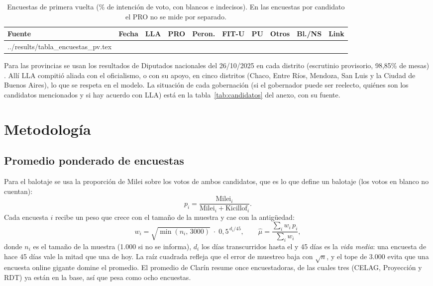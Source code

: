 \documentclass{article}
\makeatletter
\newcommand{\tablainput}[1]{\@@input #1 }
\makeatother
\begin{document}
\begin{table}[htbp]
\centering
\caption{Encuestas de primera vuelta (\% de intención de voto, con blancos e
indecisos). En las encuestas por candidato el PRO no se mide por separado.}
\label{tab:pv}
\footnotesize
\begin{tabular}{lcrrrrrrrc}
\toprule
Fuente & Fecha & LLA & PRO & Peron. & FIT-U & PU & Otros & Bl./NS & Link \\
\midrule
\tablainput{../results/tabla_encuestas_pv.tex}
\bottomrule
\end{tabular}
\end{table}

Para las provincias se usan los resultados de Diputados nacionales del
26/10/2025 en cada distrito (escrutinio provisorio, 98,85\% de mesas)
\cite{c5n2025}. Allí LLA compitió aliada con el oficialismo, o con su apoyo, en cinco distritos
(Chaco, Entre Ríos, Mendoza, San Luis y la Ciudad de Buenos Aires), lo que se
respeta en el modelo. La situación de cada gobernación (si el gobernador puede
ser reelecto, quiénes son los candidatos mencionados y si hay acuerdo con LLA)
está en la tabla~\ref{tab:candidatos} del anexo, con su fuente.

\FloatBarrier
\section{Metodología}

\subsection{Promedio ponderado de encuestas}
\label{sec:promedio}

Para el balotaje se usa la proporción de Milei sobre los votos de ambos
candidatos, que es lo que define un balotaje (los votos en blanco no cuentan):
\begin{equation}
  p_i = \frac{\text{Milei}_i}{\text{Milei}_i + \text{Kicillof}_i}.
\end{equation}
Cada encuesta $i$ recibe un peso que crece con el tamaño de la muestra y cae con
la antigüedad:
\begin{equation}
  w_i = \sqrt{\min(n_i,\,3000)}\;\cdot\;0{,}5^{\,d_i/45},
  \qquad \hat{\mu} = \frac{\sum_i w_i\,p_i}{\sum_i w_i},
\end{equation}
donde $n_i$ es el tamaño de la muestra (1.000 si no se informa), $d_i$ los días
transcurridos hasta el \fechaCorte{} y 45 días es la \emph{vida media}: una
encuesta de hace 45 días vale la mitad que una de hoy. La raíz cuadrada refleja
que el error de muestreo baja con $\sqrt{n}$, y el tope de 3.000 evita que una
encuesta online gigante domine el promedio. El promedio de Clarín resume once
encuestadoras, de las cuales tres (CELAG, Proyección y RDT) ya están en la base,
así que pesa como ocho encuestas.
\end{document}
